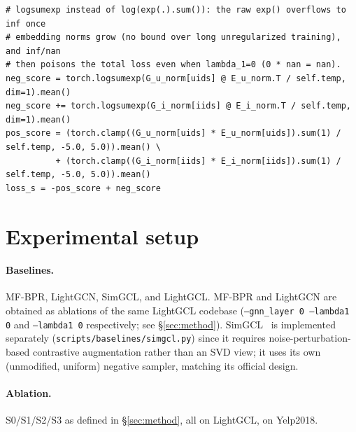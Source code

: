 \documentclass{article}
\begin{document}
\begin{lstlisting}[style=py,float=t,caption={Overflow-safe InfoNCE contrastive term (\S\ref{sec:stability}): \texttt{logsumexp} instead of \texttt{log(exp(x).sum())}.},label={lst:stability}]
# logsumexp instead of log(exp(.).sum()): the raw exp() overflows to inf once
# embedding norms grow (no bound over long unregularized training), and inf/nan
# then poisons the total loss even when lambda_1=0 (0 * nan = nan).
neg_score = torch.logsumexp(G_u_norm[uids] @ E_u_norm.T / self.temp, dim=1).mean()
neg_score += torch.logsumexp(G_i_norm[iids] @ E_i_norm.T / self.temp, dim=1).mean()
pos_score = (torch.clamp((G_u_norm[uids] * E_u_norm[uids]).sum(1) / self.temp, -5.0, 5.0)).mean() \
          + (torch.clamp((G_i_norm[iids] * E_i_norm[iids]).sum(1) / self.temp, -5.0, 5.0)).mean()
loss_s = -pos_score + neg_score
\end{lstlisting}

\section{Experimental setup}
\label{sec:setup}

\paragraph{Baselines.} MF-BPR, LightGCN, SimGCL, and LightGCL. MF-BPR and LightGCN are
obtained as ablations of the same LightGCL codebase (\texttt{--gnn\_layer 0 --lambda1 0}
and \texttt{--lambda1 0} respectively; see \S\ref{sec:method}). SimGCL~\cite{simgcl} is
implemented separately (\texttt{scripts/baselines/simgcl.py}) since it requires
noise-perturbation-based contrastive augmentation rather than an SVD view; it uses its
own (unmodified, uniform) negative sampler, matching its official design.

\paragraph{Ablation.} S0/S1/S2/S3 as defined in \S\ref{sec:method}, all on LightGCL, on
Yelp2018.
\end{document}
